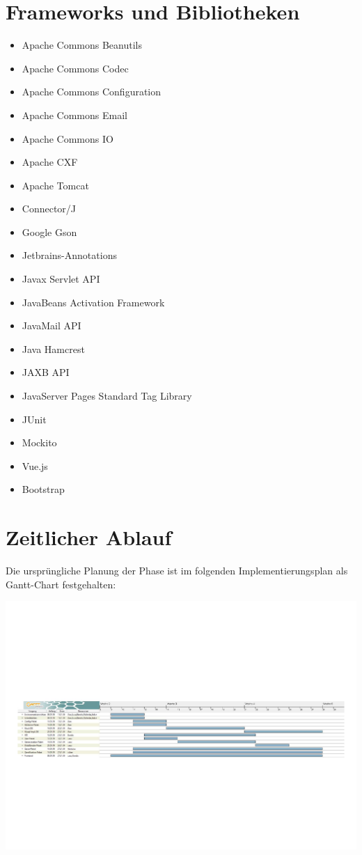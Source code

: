 \documentclass[a4paper]{scrreprt}
\begin{document}
\chapter{Frameworks und Bibliotheken}
\begin{itemize}
    \item Apache Commons Beanutils
    \item Apache Commons Codec
    \item Apache Commons Configuration
    \item Apache Commons Email
    \item Apache Commons IO
    \item Apache CXF
    \item Apache Tomcat
    \item Connector/J
    \item Google Gson
    \item Jetbrains-Annotations
    \item Javax Servlet API
    \item JavaBeans Activation Framework
    \item JavaMail API
    \item Java Hamcrest
    \item JAXB API
    \item JavaServer Pages Standard Tag Library
    \item JUnit
    \item Mockito
    \item Vue.js
    \item Bootstrap
\end{itemize}

\chapter{Zeitlicher Ablauf}
Die ursprüngliche Planung der Phase ist im folgenden Implementierungsplan als Gantt-Chart festgehalten:

\includegraphics[width=\linewidth]{img/gantt.pdf}
\end{document}
